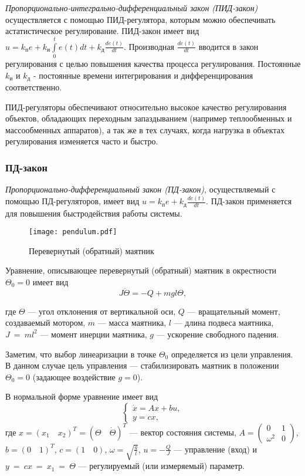 \documentclass[../../TAU.tex]{subfiles}
\begin{document}
    {\it Пропорционально-интегрально-дифференциальный закон (ПИД-закон)} осуществляется с помощью ПИД-регулятора, которым можно обеспечивать астатистическое регулирование. ПИД-закон имеет вид $u=k_\text{п}e+ k_\text{и}\int\limits_0^t e(t) dt +k_\text{д} \frac{de(t)}{dt}$. Производная $\frac{d e(t)}{dt}$ вводится в закон регулирования с целью повышения качества процесса регулирования. Постоянные $k_\text{и}$ и $k_\text{д}$ - постоянные времени интегрирования и дифференцирования соответственно.
    
    ПИД-регуляторы обеспечивают относительно высокое качество регулирования объектов, обладающих переходным запаздыванием (например теплообменных и массообменных аппаратов), а так же в тех случаях, когда нагрузка в объектах регулирования изменяется часто и быстро.


\subsubsection{ПД-закон}

    {\it Пропорционально-дифференциальный закон (ПД-закон)}, осуществляемый с помощью ПД-регуляторов, имеет вид $u=k_\text{п}e+ k_\text{д} \frac{de(t)}{dt}$. ПД-закон применяется для повышения быстродействия работы системы.

    \begin{figure}[h]
    \centering
    \texttt{[image: pendulum.pdf]}
    \caption{Перевернутый (обратный) маятник}
    \centering
    \end{figure}

    Уравнение, описывающее перевернутый (обратный) маятник в окрестности $\Theta_0=0$ имеет вид
    \begin{equation}\label{EQ1_1}
    J\ddot\Theta = -Q+mgl\Theta,
    \end{equation}
    {\small где $\Theta$ --- угол отклонения от вертикальной оси, $Q$ --- вращательный момент, создаваемый мотором, $m$ --- масса маятника, $l$ --- длина подвеса
    маятника, $J~=~ml^2$ --- момент инерции маятника, $g$ --- ускорение свободного падения.

    Заметим, что выбор линеаризации в точке $\Theta_0$ определяется из цели управления. В данном случае цель управления --- стабилизировать маятник в положении $\Theta_0 = 0$ (задающее воздействие $g = 0$).
    }

    В нормальной форме уравнение  имеет вид
    \begin{equation}\label{EQ1_1NORM}
    \begin{cases}
    \dot x = Ax + bu,\\
    y = c x,
    \end{cases}
    \end{equation}
    где $x = (x_1\quad x_2)^T = ( \Theta\quad \dot\Theta)^T$ --- вектор состояния системы, 
    $A =\begin{pmatrix}0 & 1\\ 

    \omega^2& 0\end{pmatrix}$, $b=(0\quad 1)^T$, $c=(1\quad0)$, $\omega=\sqrt{\frac{g}{l}}$, $u=-\frac{Q}{J}$ --- управление (вход) и $y~=~cx~=~x_1~=~\Theta$ --- регулируемый (или измеряемый) параметр.
\end{document}
